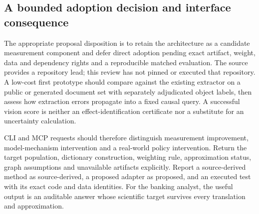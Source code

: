 \subsection{A bounded adoption decision and interface consequence}
The appropriate proposal disposition is to retain the architecture as a candidate measurement component and defer direct
adoption pending exact artifact, weight, data and dependency rights and a reproducible matched evaluation. The source provides
a repository lead; this review has not pinned or executed that repository. A low-cost first prototype should compare against
the existing extractor on a public or generated document set with separately adjudicated object labels, then assess how
extraction errors propagate into a fixed causal query. A successful vision score is neither an effect-identification certificate
nor a substitute for an uncertainty calculation.

CLI and MCP requests should therefore distinguish measurement improvement, model-mechanism intervention and a real-world
policy intervention. Return the target population, dictionary construction, weighting rule, approximation status, graph
assumptions and unavailable artifacts explicitly. Report a source-derived method as source-derived, a proposed adapter as
proposed, and an executed test with its exact code and data identities. For the banking analyst, the useful output is an
auditable answer whose scientific target survives every translation and approximation.
